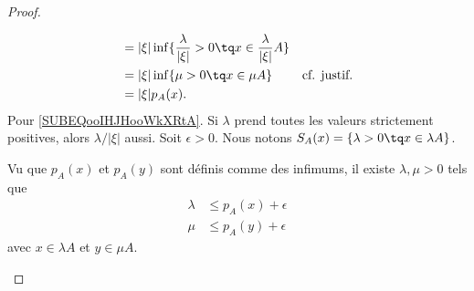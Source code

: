 \begin{proof}
\begin{subproof}
\begin{subequations}
\begin{align}
				           & =| \xi |\inf\{ \frac{ \lambda }{ | \xi | }>0\tq x\in\frac{ \lambda }{ | \xi | }A \}                                                   \\
				           & =| \xi |\inf\{ \mu>0\tq x\in \mu A \}                                               & \text{cf. justif.}		\label{SUBEQooIHJHooWkXRtA} \\
				           & =| \xi |p_A(x).
			\end{align}
		\end{subequations}
		Pour \eqref{SUBEQooIHJHooWkXRtA}. Si \( \lambda\) prend toutes les valeurs strictement positives, alors \( \lambda/| \xi |\) aussi.
		\spitem[\( p_A(x+y)\leq p_A(x)+p_A(y)\)]
		Soit \( \epsilon>0\). Nous notons \( S_A(x)=\{ \lambda>0 \tq x\in \lambda A \}\).

		Vu que \( p_A(x)\) et \( p_A(y)\) sont définis comme des infimums, il existe \( \lambda,\mu>0\) tels que
		\begin{subequations}
			\begin{align}
				\lambda & \leq p_A(x)+\epsilon \\
				\mu     & \leq p_A(y)+\epsilon
			\end{align}
		\end{subequations}
		avec \( x\in \lambda A\) et \( y\in \mu A\).


\end{subproof}
\end{proof}
